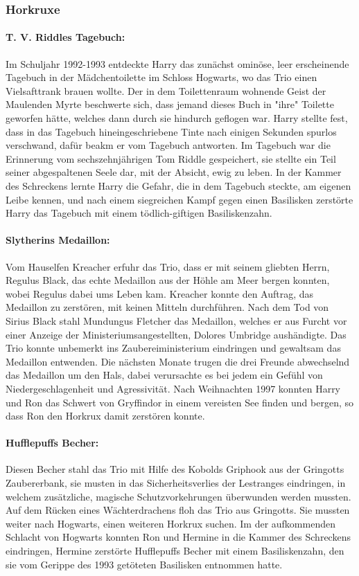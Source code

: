 \documentclass[a4paper, 10pt]{article}
\begin{document}
\subsubsection*{\large Horkruxe}
\paragraph{T. V. Riddles Tagebuch:}
Im Schuljahr 1992-1993 entdeckte Harry das zunächst ominöse, leer erscheinende Tagebuch in der Mädchentoilette im Schloss Hogwarts, wo das Trio einen Vielsafttrank brauen wollte. Der in dem Toilettenraum wohnende Geist der Maulenden Myrte beschwerte sich, dass jemand dieses Buch in "ihre" Toilette geworfen hätte, welches dann durch sie hindurch geflogen war. Harry stellte fest, dass in das Tagebuch hineingeschriebene Tinte nach einigen Sekunden spurlos verschwand, dafür beakm er vom Tagebuch antworten. Im Tagebuch war die Erinnerung vom sechszehnjährigen Tom Riddle gespeichert, sie stellte ein Teil seiner abgespaltenen Seele dar, mit der Absicht, ewig zu leben. In der Kammer des Schreckens lernte Harry die Gefahr, die in dem Tagebuch steckte, am eigenen Leibe kennen, und nach einem siegreichen Kampf gegen einen Basilisken zerstörte Harry das Tagebuch mit einem tödlich-giftigen Basiliskenzahn.
\paragraph{Slytherins Medaillon:}
Vom Hauselfen Kreacher erfuhr das Trio, dass er mit seinem gliebten Herrn, Regulus Black, das echte Medaillon aus der Höhle am Meer bergen konnten, wobei Regulus dabei ums Leben kam. Kreacher konnte den Auftrag, das Medaillon zu zerstören, mit keinen Mitteln durchführen. Nach dem Tod von Sirius Black stahl Mundungus Fletcher das Medaillon, welches er aus Furcht vor einer Anzeige der Ministeriumsangestellten, Dolores Umbridge aushändigte. Das Trio konnte unbemerkt ins Zaubereiministerium eindringen und gewaltsam das Medaillon entwenden. Die nächsten Monate trugen die drei Freunde abwechselnd das Medaillon um den Hals, dabei verursachte es bei jedem ein Gefühl von Niedergeschlagenheit und Agressivität. Nach Weihnachten 1997 konnten Harry und Ron das Schwert von Gryffindor in einem vereisten See finden und bergen, so dass Ron den Horkrux damit zerstören konnte.
\paragraph{Hufflepuffs Becher:}
Diesen Becher stahl das Trio mit Hilfe des Kobolds Griphook aus der Gringotts Zaubererbank, sie musten in das Sicherheitsverlies der Lestranges eindringen, in welchem zusätzliche, magische Schutzvorkehrungen überwunden werden mussten. Auf dem Rücken eines Wächterdrachens floh das Trio aus Gringotts. Sie mussten weiter nach Hogwarts, einen weiteren Horkrux suchen. Im der aufkommenden Schlacht von Hogwarts konnten Ron und Hermine in die Kammer des Schreckens eindringen, Hermine zerstörte Hufflepuffs Becher mit einem Basiliskenzahn, den sie vom Gerippe des 1993 getöteten Basilisken entnommen hatte.
\end{document}
